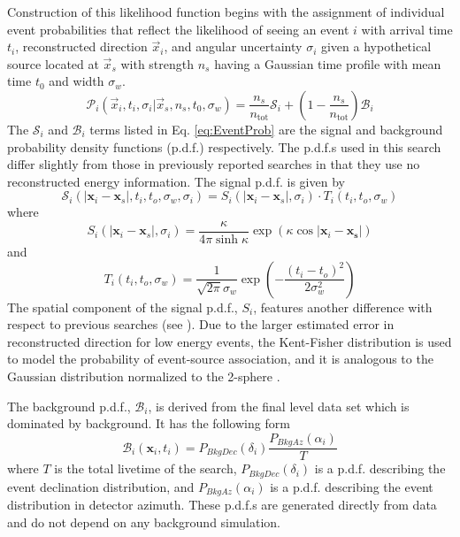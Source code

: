 \documentclass[manuscript]{aastex}
\begin{document}
Construction of this likelihood function begins with the assignment of individual event probabilities that reflect the likelihood of seeing an event $i$ with arrival time $t_i$, reconstructed direction $\vec{x}_i$, and angular uncertainty $\sigma_i$ given a hypothetical source located at $\vec{x}_s$ with strength $n_s$ having a Gaussian time profile with mean time $t_0$ and width $\sigma_w$.
\begin{equation}\label{eq:EventProb}
\mathcal{P}_i(\vec{x}_i,t_i,\sigma_i|\vec{x}_s,n_s,t_0,\sigma_w) = \frac{n_s}{n_{\mathrm{tot}}} \mathcal{S}_i + \left(1-\frac{n_s}{n_{\mathrm{tot}}}\right) \mathcal{B}_i
\end{equation}
The $\mathcal{S}_i$ and $\mathcal{B}_i$ terms listed in Eq. \ref{eq:EventProb} are the signal and background probability density functions (p.d.f.) respectively. The p.d.f.s used in this search differ slightly from those in previously reported searches in that they use no reconstructed energy information. The signal p.d.f. is given by
\begin{equation}
\mathcal{S}_i(|\mathbf{x}_i-\mathbf{x}_s|,t_i,t_o,\sigma_w,\sigma_i) = S_i(|\mathbf{x}_i-\mathbf{x}_s|,\sigma_i) \cdot T_i(t_i,t_o,\sigma_w)
\end{equation}
where
\begin{equation}
S_i(|\mathbf{x}_i-\mathbf{x}_s|,\sigma_i) = \frac{\kappa}{4\pi \sinh \kappa} \exp \left(\kappa \cos |\mathbf{x}_i-\mathbf{x_s}|\right)
\end{equation}
and
\begin{equation}
T_i(t_i,t_o,\sigma_w) = \frac{1}{\sqrt{2\pi}\sigma_w} \exp \left(-\frac{(t_i-t_o)^2}{2 \sigma_w^2}\right)
\end{equation}
The spatial component of the signal p.d.f., $S_i$, features another difference with respect to previous searches (see \cite{2014ApJ...796..109A}). Due to the larger estimated error in reconstructed direction for low energy events, the Kent-Fisher distribution is used to model the probability of event-source association, and it is analogous to the Gaussian distribution normalized to the 2-sphere \citep{Fisher_Bingham}.

The background p.d.f., $\mathcal{B}_i$, is derived from the final level data set which is dominated by background. It has the following form
\begin{equation}
\mathcal{B}_i(\mathbf{x}_i,t_i) = P_{BkgDec}(\delta_i)\frac{P_{BkgAz}(\alpha_i)}{T}
\end{equation}
where $T$ is the total livetime of the search, $P_{BkgDec}(\delta_i)$ is a p.d.f. describing the event declination distribution, and $P_{BkgAz}(\alpha_i)$ is a p.d.f. describing the event distribution in detector azimuth. These p.d.f.s are generated directly from data and do not depend on any background simulation.
\end{document}

